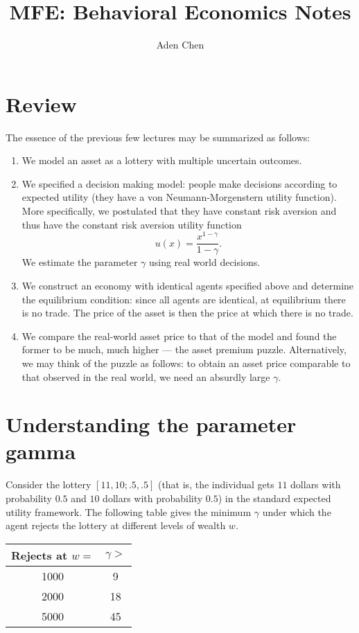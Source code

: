\documentclass[oneside,reqno,letterpaper]{amsart}
\title[MFE: Behavioral Economics Notes]{MFE: Behavioral Economics Notes}
\author{Aden Chen}
\begin{document}
\maketitle
\tableofcontents

\section{Review}
The essence of the previous few lectures may be summarized as follows:
\begin{enumerate}[label=(\roman*)]
  \item We model an asset as a lottery with multiple uncertain outcomes.
  \item We specified a decision making model: people make decisions according to expected utility (they have a von Neumann-Morgenstern utility function). 
    More specifically, we postulated that they have constant risk aversion and thus have the constant risk aversion utility function
    \[
      u(x) = \frac{x^{1 - \gamma}}{1 - \gamma}.
    \] 
    We estimate the parameter \(\gamma\) using real world decisions.
  \item We construct an economy with identical agents specified above and determine the equilibrium condition: since all agents are identical, at equilibrium there is no trade.
    The price of the asset is then the price at which there is no trade.
  \item We compare the real-world asset price to that of the model and found the former to be much, much higher --- the asset premium puzzle.
    Alternatively, we may think of the puzzle as follows:
    to obtain an asset price comparable to that observed in the real world, we need an absurdly large \(\gamma\).
\end{enumerate}


\section{Understanding the parameter gamma}
Consider the lottery \([11, 10; .5, .5]\) (that is, the individual gets \(11\) dollars with probability \(0.5\) and \(10\) dollars with probability \(0.5\)) in the standard expected utility framework.
The following table gives the minimum \(\gamma\) under which the agent rejects the lottery at different levels of wealth \(w\).

\begin{tabular}{ c c } 
  Rejects at \(w=\) & \(\gamma > \) \\ 
\hline
  \num{1000} & 9 \\ 
  \num{2000} & 18 \\ 
  \num{5000} & 45 \\ 
\end{tabular}
\end{document}
